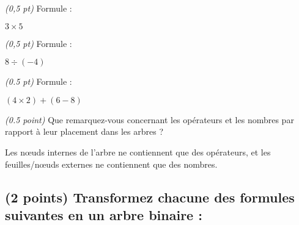 \documentclass[11pt,a4paper]{article}
\begin{document}
\begin{table}[ht!]
  \centering
  \begin{minipage}{0.30\textwidth}
    \centering

\textit{(0,5 pt)} Formule :

\medskip

$ 3 \times 5 $

  \end{minipage}
  \hfillx
  \begin{minipage}{0.30\textwidth}
    \centering

\textit{(0,5 pt)} Formule :

\medskip

$ 8 \div (-4) $

  \end{minipage}
  \hfillx
  \begin{minipage}{0.40\textwidth}
    \centering

\textit{(0.5 pt)} Formule :

\medskip

$ (4 \times 2) + (6 - 8) $

  \end{minipage}
\end{table}


\noindent \textit{(0.5 point)} Que remarquez-vous concernant les opérateurs et les nombres par rapport à leur placement dans les arbres ?

\medskip

Les nœuds internes de l'arbre ne contiennent que des opérateurs, et les feuilles/nœuds externes ne contiennent que des nombres.



\subsection{(2 points) Transformez chacune des formules suivantes en un arbre binaire : }

\vspace*{-0.5cm}
\end{document}
